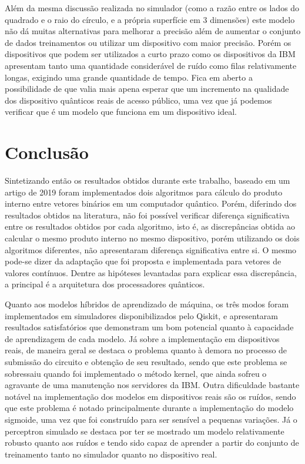 Além da mesma discussão realizada no simulador (como a razão entre os lados do quadrado e o raio do círculo, e a própria superfície em 3 dimensões) este modelo não  dá muitas alternativas para melhorar a precisão além de aumentar o conjunto de dados treinamentos ou utilizar um dispositivo com maior precisão. Porém os dispositivos que podem ser utilizados a curto prazo como os dispositivos da IBM apresentam tanto uma quantidade considerável de ruído como filas relativamente longas, exigindo uma grande quantidade de tempo. Fica em aberto a possibilidade de que valia mais apena esperar que um incremento na qualidade dos dispositivo quânticos reais de acesso público, uma vez que já podemos verificar que é um modelo que funciona em um dispositivo ideal.



\chapter{Conclusão}

Sintetizando então os resultados obtidos durante este trabalho, baseado em um artigo de 2019 \cite{Italiano} foram implementados dois algoritmos para cálculo do produto interno entre vetores binários em um computador quântico. Porém, diferindo dos resultados obtidos na literatura, não foi possível verificar diferença significativa entre os resultados obtidos por cada algoritmo, isto é, as discrepâncias obtida ao calcular o mesmo produto interno  no mesmo dispositivo, porém utilizando os dois algoritmos diferentes, não apresentaram diferença significativa entre si. O mesmo pode-se dizer da adaptação que foi proposta e implementada para vetores de valores contínuos. Dentre as hipóteses levantadas para explicar essa discrepância, a principal é a arquitetura dos processadores quânticos.

Quanto aos modelos híbridos de aprendizado de máquina, os três modos foram implementados em simuladores disponibilizados pelo Qiskit, e apresentaram resultados satisfatórios que demonstram um bom potencial quanto à capacidade de aprendizagem de cada modelo. Já sobre a implementação em dispositivos reais, de maneira geral se destaca o problema quanto à demora no processo de submissão do circuito e obtenção de seu resultado, sendo que este problema se sobressaiu quando foi implementado o método kernel, que ainda sofreu o agravante de uma manutenção nos servidores da IBM. Outra dificuldade bastante notável na implementação dos modelos em dispositivos reais são os ruídos, sendo que este problema é notado principalmente durante a implementação do modelo sigmoide, uma vez que foi construído para ser sensível a pequenas variações. Já o perceptron simulado se destaca por ter se mostrado um modelo relativamente robusto quanto aos ruídos e tendo sido capaz de aprender a partir do conjunto de treinamento tanto no simulador quanto no dispositivo real.

